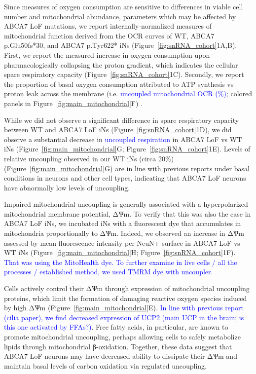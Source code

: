 Since measures of oxygen consumption are sensitive to differences in viable cell number and mitochondrial abundance\cite{Divakaruni2014-eq,Gu2021-ms}, parameters which may be affected by ABCA7 LoF mutations, we report internally-normalized measures of mitochondrial function derived from the OCR curves\cite{Divakaruni2022-rj} of WT, ABCA7 p.Glu50fs*30, and ABCA7 p.Tyr622* iNs (Figure~\ref{fig:snRNA_cohort}1A,B).  First, we  report the measured increase in oxygen consumption upon pharmacologically collapsing the proton gradient, which indicates the cellular spare respiratory capacity \cite{Divakaruni2022-rj}(Figure~\ref{fig:snRNA_cohort}1C).  Secondly, we report the proportion of basal oxygen consumption attributed to ATP synthesis vs proton leak across the membrane  (i.e. \textcolor{blue}{uncoupled mitochondrial OCR (\%)}; colored panels in Figure~\ref{fig:main_mitochondrial}F) \cite{Divakaruni2014-eq}. 

While we did not observe a significant difference in spare respiratory capacity between WT and ABCA7 LoF iNs (Figure~\ref{fig:snRNA_cohort}1D), we did observe a substantial decrease in \textcolor{blue}{uncoupled respiration} in ABCA7 LoF vs WT iNs (Figure~\ref{fig:main_mitochondrial}G; Figure~\ref{fig:snRNA_cohort}1E). Levels of relative uncoupling observed in our WT iNs (circa 20\%) (Figure~\ref{fig:main_mitochondrial}G) are in line with previous reports under basal conditions in neurons and other cell types\cite{Divakaruni2011-uj,Jekabsons2004-fn}, indicating that ABCA7 LoF neurons have abnormally low levels of uncoupling. 

Impaired mitochondrial uncoupling is generally associated with a hyperpolarized mitochondrial membrane potential, ΔѰm\cite{Demine2019-qj,Zorov2021-dq}. To verify that this was also the case in ABCA7 LoF iNs, we incubated iNs with a fluorescent dye that accumulates in mitochondria proportionally to ΔѰm. Indeed, we observed an increase in ΔѰm assessed by mean fluorescence intensity per NeuN+ surface in ABCA7 LoF vs WT iNs (Figure~\ref{fig:main_mitochondrial}H; Figure~\ref{fig:snRNA_cohort}1F). \textcolor{blue}{That was using the MitoHealth dye. To further examine in live cells / all the processes / established method, we used TMRM dye with uncoupler}. 

Cells actively control their ΔѰm through expression of mitochondrial uncoupling proteins\cite{noauthor_2021-tx,noauthor_2021-im}, which limit the formation of damaging reactive oxygen species induced by high ΔѰm\cite{Suski2012-zo} (Figure~\ref{fig:main_mitochondrial}E). \textcolor{blue}{In line with previous report (cilia paper), we find decreased expression of UCP2 (main UCP in the brain; is this one activated by FFAs?)}. Free fatty acids, in particular, are known to promote mitochondrial uncoupling\cite{Hoang2015-vm,noauthor_1999-dt,Ardalan2022-bk}, perhaps allowing cells to safely metabolize lipids through mitochondrial β-oxidation. Together, these data suggest that ABCA7 LoF neurons may have decreased ability to dissipate their ΔѰm and maintain basal levels of carbon oxidation via regulated uncoupling. 

